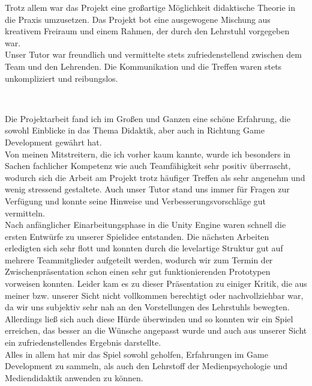 \documentclass[10pt,a4paper,notitlepage]{report}
\begin{document}
	Trotz allem war das Projekt eine großartige Möglichkeit didaktische Theorie in die Praxis umzusetzen. Das Projekt bot eine ausgewogene Mischung aus kreativem Freiraum und einem Rahmen, der durch den Lehrstuhl vorgegeben war.\\
	Unser Tutor war freundlich und vermittelte stets zufriedenstellend zwischen dem Team und den Lehrenden. Die Kommunikation und die Treffen waren stets unkompliziert und reibungslos.\\\par\smallskip

	\\\par\medskip\Text
	Die Projektarbeit fand ich im Großen und Ganzen eine schöne Erfahrung, die sowohl Einblicke in das Thema Didaktik, aber auch in Richtung Game Development gewährt hat.\\
	Von meinen Mitstreitern, die ich vorher kaum kannte, wurde ich besonders in Sachen fachlicher Kompetenz wie auch Teamfähigkeit sehr positiv überrascht, wodurch sich die Arbeit am Projekt trotz häufiger Treffen als sehr angenehm und wenig stressend gestaltete. Auch unser Tutor stand uns immer für Fragen zur Verfügung und konnte seine Hinweise und Verbesserungsvorschläge gut vermitteln.\\
	Nach anfänglicher Einarbeitungsphase in die Unity Engine waren schnell die ersten Entwürfe zu unserer Spielidee entstanden. Die nächsten Arbeiten erledigten sich sehr flott und konnten durch die levelartige Struktur gut auf mehrere Teammitglieder aufgeteilt werden, wodurch wir zum Termin der Zwischenpräsentation schon einen sehr gut funktionierenden Prototypen vorweisen konnten. Leider kam es zu dieser Präsentation zu einiger Kritik, die aus meiner bzw. unserer Sicht nicht vollkommen berechtigt oder nachvollziehbar war, da wir uns subjektiv sehr nah an den Vorstellungen des Lehrstuhls bewegten. Allerdings ließ sich auch diese Hürde überwinden und so konnten wir ein Spiel erreichen, das besser an die Wünsche angepasst wurde und auch aus unserer Sicht ein zufriedenstellendes Ergebnis darstellte.\\
	Alles in allem hat mir das Spiel sowohl geholfen, Erfahrungen im Game Development zu sammeln, als auch den Lehrstoff der Medienpsychologie und Mediendidaktik anwenden zu können.\\\par\smallskip
	
	\clearpage
	\marginpar{\vspace{3.0mm} \color{orange}\rule{0.8mm}{53.3mm} \\[3mm] \color{hellorange}\rule{0.8mm}{170mm}}
	\par\bigskip
	
\end{document}
